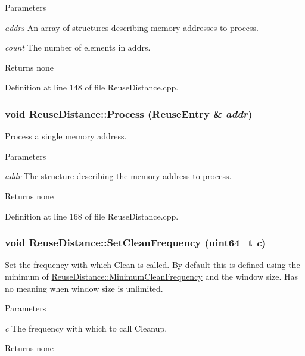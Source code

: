 \begin{DoxyParams}{Parameters}
\item[{\em addrs}]An array of structures describing memory addresses to process. \item[{\em count}]The number of elements in addrs.\end{DoxyParams}
\begin{DoxyReturn}{Returns}
none 
\end{DoxyReturn}


Definition at line 148 of file ReuseDistance.cpp.

\hypertarget{class_reuse_distance_a4ff6b77022ce62e0fdefa5cc297b932a}{
\subsubsection[{Process}]{\setlength{\rightskip}{0pt plus 5cm}void ReuseDistance::Process ({\bf ReuseEntry} \& {\em addr})}}
\label{class_reuse_distance_a4ff6b77022ce62e0fdefa5cc297b932a}
Process a single memory address.


\begin{DoxyParams}{Parameters}
\item[{\em addr}]The structure describing the memory address to process.\end{DoxyParams}
\begin{DoxyReturn}{Returns}
none 
\end{DoxyReturn}


Definition at line 168 of file ReuseDistance.cpp.

\hypertarget{class_reuse_distance_a26ca9122b91b17f298bdb9cbe44a6d63}{
\subsubsection[{SetCleanFrequency}]{\setlength{\rightskip}{0pt plus 5cm}void ReuseDistance::SetCleanFrequency (uint64\_\-t {\em c})}}
\label{class_reuse_distance_a26ca9122b91b17f298bdb9cbe44a6d63}
Set the frequency with which Clean is called. By default this is defined using the minimum of \hyperlink{class_reuse_distance_a3aebe8066043c0875b427418a8326a3a}{ReuseDistance::MinimumCleanFrequency} and the window size. Has no meaning when window size is unlimited.


\begin{DoxyParams}{Parameters}
\item[{\em c}]The frequency with which to call Cleanup.\end{DoxyParams}
\begin{DoxyReturn}{Returns}
none 
\end{DoxyReturn}


